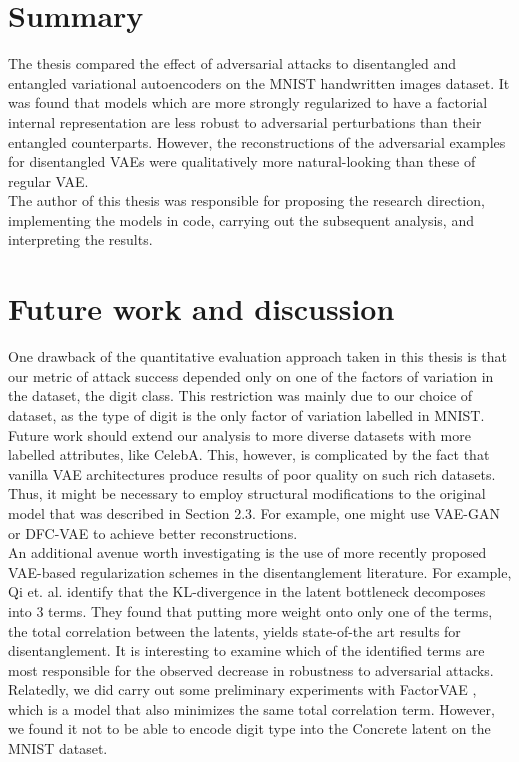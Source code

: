 \documentclass{report}
\begin{document}
\section{Summary}

The thesis compared the effect of adversarial attacks to disentangled and entangled variational autoencoders on the MNIST handwritten images dataset. It was found that models which are more strongly regularized to have a factorial internal representation are less robust to adversarial perturbations than their entangled counterparts. However, the reconstructions of the adversarial examples for disentangled VAEs were qualitatively more natural-looking than these of regular VAE. \\

\noindent The author of this thesis was responsible for proposing the research direction, implementing the models in code, carrying out the subsequent analysis, and interpreting the results.

\section{Future work and discussion}

\noindent One drawback of the quantitative evaluation approach taken in this thesis is that our metric of attack success depended only on one of the factors of variation in the dataset, the digit class. This restriction was mainly due to our choice of dataset, as the type of digit is the only factor of variation labelled in MNIST. Future work should extend our analysis to more diverse datasets with more labelled attributes, like CelebA. This, however, is complicated by the fact that vanilla VAE architectures produce results of poor quality on such rich datasets. Thus, it might be necessary to employ structural modifications to the original model that was described in Section 2.3. For example, one might use VAE-GAN \cite{vaegan} or DFC-VAE \cite{dfc-vae} to achieve better reconstructions. \\

\noindent An additional avenue worth investigating is the use of more recently proposed VAE-based regularization schemes in the disentanglement literature. For example, Qi et. al. \cite{tc-vae} identify that the KL-divergence in the latent bottleneck decomposes into 3 terms. They found that putting more weight onto only one of the terms, the total correlation between the latents, yields state-of-the art results for disentanglement. It is interesting to examine which of the identified terms are most responsible for the observed decrease in robustness to adversarial attacks. Relatedly, we did carry out some preliminary experiments with FactorVAE \cite{factor-vae}, which is a model that also minimizes the same total correlation term. However, we found it not to be able to encode digit type into the Concrete latent on the MNIST dataset. \\ 
\end{document}
